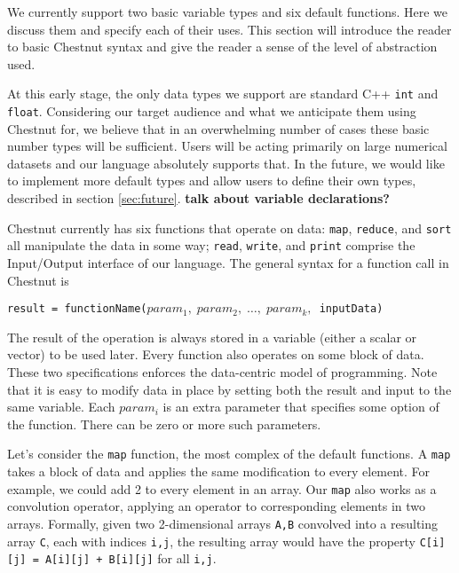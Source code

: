 \documentclass{article}
\renewcommand{\|}{\origbar} %
\newcommand{\code}[1]{\texttt{#1}}
\begin{document}
We currently support two basic variable types and six default functions. Here we discuss them and specify each of their uses. This section will introduce the reader to basic Chestnut syntax and give the reader a sense of the level of abstraction used.

At this early stage, the only data types we support are standard C++ \code{int} and \code{float}. Considering our target audience and what we anticipate them using Chestnut for, we believe that in an overwhelming number of cases these basic number types will be sufficient. Users will be acting primarily on large numerical datasets and our language absolutely supports that. In the future, we would like to implement more default types and allow users to define their own types, described in section \ref{sec:future}. {\bf talk about variable declarations?}

Chestnut currently has six functions that operate on data: \code{map}, \code{reduce}, and \code{sort} all manipulate the data in some way; \code{read}, \code{write}, and \code{print} comprise the Input/Output interface of our language. The general syntax for a function call in Chestnut is
\begin{center}
  \code{result = functionName($param_1,\;param_2, \;\ldots, \;param_k,$ inputData)}
\end{center}
The result of the operation is always stored in a variable (either a scalar or vector) to be used later. Every function also operates on some block of data. These two specifications enforces the data-centric model of programming. Note that it is easy to modify data in place by setting both the result and input to the same variable. Each $param_i$ is an extra parameter that specifies some option of the function. There can be zero or more such parameters. 

Let's consider the \code{map} function, the most complex of the default functions. A \code{map} takes a block of data and applies the same modification to every element. For example, we could add 2 to every element in an array. Our \code{map} also works as a convolution operator, applying an operator to corresponding elements in two arrays. Formally, given two 2-dimensional arrays \code{A,B} convolved into a resulting array \code{C}, each with indices \code{i,j}, the resulting array would have the property \code{C[i][j]~=~A[i][j]~+~B[i][j]} for all \code{i,j}.
\end{document}
